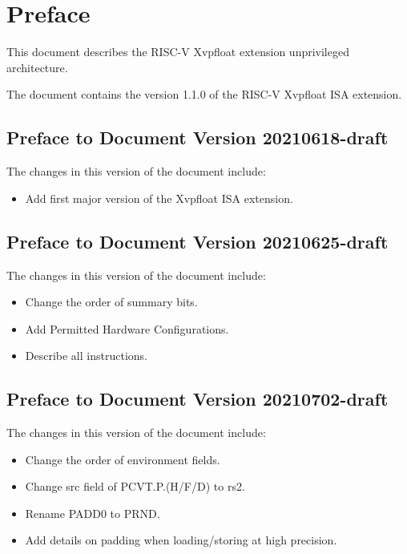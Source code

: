 \chapter{Preface}

This document describes the RISC-V Xvpfloat extension unprivileged architecture.

The document contains the version 1.1.0 of the RISC-V Xvpfloat ISA extension.



\section*{Preface to Document Version 20210618-draft}

The changes in this version of the document include:
\vspace{-0.2in}
\begin{itemize}
\parskip 0pt
\itemsep 1pt
\item Add first major version of the Xvpfloat ISA extension.
\end{itemize}

\section*{Preface to Document Version 20210625-draft}

The changes in this version of the document include:
\vspace{-0.2in}
\begin{itemize}
\parskip 0pt
\itemsep 1pt
\item Change the order of summary bits.
\item Add Permitted Hardware Configurations.
\item Describe all instructions.
\end{itemize}

\section*{Preface to Document Version 20210702-draft}

The changes in this version of the document include:
\vspace{-0.2in}
\begin{itemize}
\parskip 0pt
\itemsep 1pt
\item Change the order of environment fields.
\item Change src field of PCVT.P.(H/F/D) to rs2.
\item Rename PADD0 to PRND.
\item Add details on padding when loading/storing at high precision.
\end{itemize}

